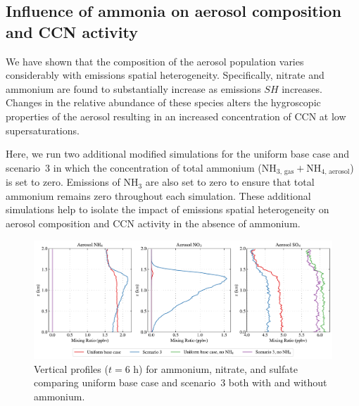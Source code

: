 \subsection{Influence of ammonia on aerosol composition and CCN activity}

We have shown that the composition of the aerosol population varies considerably with emissions spatial heterogeneity. Specifically, nitrate and ammonium are found to substantially increase as emissions $SH$ increases. Changes in the relative abundance of these species alters the hygroscopic properties of the aerosol resulting in an increased concentration of CCN at low supersaturations. 

Here, we run two additional modified simulations for the uniform base case and scenario~3 in which the concentration of total ammonium ($\text{NH}_{3\text{, gas}} + \text{NH}_{4\text{, aerosol}}$) is set to zero. Emissions of NH$_3$ are also set to zero to ensure that total ammonium remains zero throughout each simulation. These additional simulations help to isolate the impact of emissions spatial heterogeneity on aerosol composition and CCN activity in the absence of ammonium.  

\begin{figure}[!t]
  \centering
    \includegraphics[width=\textwidth]{figures/chapter5/aerosol-SNA-vertical-profiles-no-nh4-cases-time36.pdf}
    \caption{Vertical profiles ($t=6$ h) for ammonium, nitrate, and sulfate comparing uniform base case and scenario~3 both with and without ammonium.}
    \label{fig:vert-profiles-no-nh4}
\end{figure}


